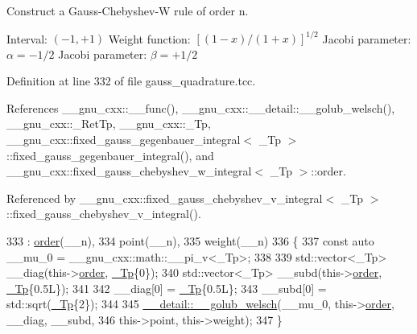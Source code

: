 Construct a Gauss-\/\+Chebyshev-\/W rule of order {\ttfamily n}.

Interval\+: $ (-1, +1) $ Weight function\+: $ [(1-x)/(1+x)]^{1/2} $ Jacobi parameter\+: $ \alpha = -1/2 $ Jacobi parameter\+: $ \beta = +1/2 $ 

Definition at line 332 of file gauss\+\_\+quadrature.\+tcc.



References \+\_\+\+\_\+gnu\+\_\+cxx\+::\+\_\+\+\_\+func(), \+\_\+\+\_\+gnu\+\_\+cxx\+::\+\_\+\+\_\+detail\+::\+\_\+\+\_\+golub\+\_\+welsch(), \+\_\+\+\_\+gnu\+\_\+cxx\+::\+\_\+\+Ret\+Tp, \+\_\+\+\_\+gnu\+\_\+cxx\+::\+\_\+\+Tp, \+\_\+\+\_\+gnu\+\_\+cxx\+::fixed\+\_\+gauss\+\_\+gegenbauer\+\_\+integral$<$ \+\_\+\+Tp $>$\+::fixed\+\_\+gauss\+\_\+gegenbauer\+\_\+integral(), and \+\_\+\+\_\+gnu\+\_\+cxx\+::fixed\+\_\+gauss\+\_\+chebyshev\+\_\+w\+\_\+integral$<$ \+\_\+\+Tp $>$\+::order.



Referenced by \+\_\+\+\_\+gnu\+\_\+cxx\+::fixed\+\_\+gauss\+\_\+chebyshev\+\_\+v\+\_\+integral$<$ \+\_\+\+Tp $>$\+::fixed\+\_\+gauss\+\_\+chebyshev\+\_\+v\+\_\+integral().


\begin{DoxyCode}
333     : \hyperlink{struct____gnu__cxx_1_1fixed__gauss__chebyshev__w__integral_a5e530e42d3634af232d18ad5d95914c9}{order}(\_\_n),
334       point(\_\_n),
335       weight(\_\_n)
336     \{
337       \textcolor{keyword}{const} \textcolor{keyword}{auto} \_\_mu\_0 = \_\_gnu\_cxx::math::\_\_pi\_v<\_Tp>;
338 
339       std::vector<\_Tp> \_\_diag(this->\hyperlink{struct____gnu__cxx_1_1fixed__gauss__chebyshev__w__integral_a5e530e42d3634af232d18ad5d95914c9}{order}, \hyperlink{namespace____gnu__cxx_a3b19a9c800ca194374ef9172290f7d79}{\_Tp}\{0\});
340       std::vector<\_Tp> \_\_subd(this->\hyperlink{struct____gnu__cxx_1_1fixed__gauss__chebyshev__w__integral_a5e530e42d3634af232d18ad5d95914c9}{order}, \hyperlink{namespace____gnu__cxx_a3b19a9c800ca194374ef9172290f7d79}{\_Tp}\{0.5L\});
341 
342       \_\_diag[0] = \hyperlink{namespace____gnu__cxx_a3b19a9c800ca194374ef9172290f7d79}{\_Tp}\{0.5L\};
343       \_\_subd[0] = std::sqrt(\hyperlink{namespace____gnu__cxx_a3b19a9c800ca194374ef9172290f7d79}{\_Tp}\{2\});
344 
345       \hyperlink{namespace____gnu__cxx_1_1____detail_aa9f299bb7c04606a9a9aab3ab9e4f4c8}{\_\_detail::\_\_golub\_welsch}(\_\_mu\_0, this->\hyperlink{struct____gnu__cxx_1_1fixed__gauss__chebyshev__w__integral_a5e530e42d3634af232d18ad5d95914c9}{order}, \_\_diag, \_\_subd,
346                                this->point, this->weight);
347     \}
\end{DoxyCode}



